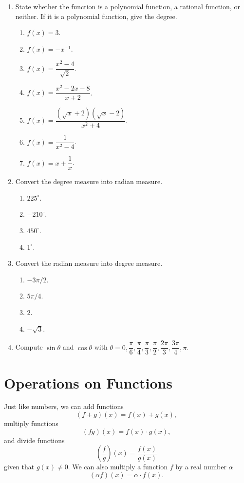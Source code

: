 \documentclass[11pt]{book}
\theoremstyle{break}
\theoremstyle{no_label}
\numberwithin{equation}{section}
\begin{document}
\begin{enumerate}[label=\arabic*.]
    \item State whether the function is a polynomial function, a rational function, or neither. If it is a polynomial function, give the degree.
    \begin{enumerate}
        \item $f(x)=3$.
        \item $f(x)=-x^{-1}$.
        \item $f(x)=\dfrac{x^2-4}{\sqrt{2}}$.
        \item $f(x)=\dfrac{x^2-2x-8}{x+2}$.
        \item $f(x)=\dfrac{(\sqrt{x}+2)(\sqrt{x}-2)}{x^2+4}$.
        \item $f(x)=\dfrac{1}{x^2-4}$.
        \item $f(x)=x+\dfrac{1}{x}$.
    \end{enumerate}
    \item Convert the degree measure into radian measure.
    \begin{enumerate}
        \item $225^\circ$.
        \item $-210^\circ$.
        \item $450^\circ$.
        \item $1^\circ$.
    \end{enumerate}
    \item Convert the radian measure into degree measure.
    \begin{enumerate}
        \item $-3\pi/2$.
        \item $5\pi/4$.
        \item $2$.
        \item $-\sqrt{3}$.
    \end{enumerate}
    \item Compute $\sin\theta$ and $\cos\theta$ with $\theta=0, \dfrac{\pi}{6}, \dfrac{\pi}{4}, \dfrac{\pi}{3}, \dfrac{\pi}{2}, \dfrac{2\pi}{3}, \dfrac{3\pi}{4}, \pi.$
    
\end{enumerate}


\section{Operations on Functions}

\setlength{\delimitershortfall}{0pt}

Just like numbers, we can add functions $$(f+g)(x)=f(x)+g(x),$$ multiply functions $$(fg)(x)=f(x)\cdot g(x),$$ and divide functions $$\left(\dfrac{f}{g}\right)(x)=\dfrac{f(x)}{g(x)}$$ given that $g(x)\ne 0$. We can also multiply a function $f$ by a real number $\alpha$ $$(\alpha f)(x)=\alpha\cdot f(x).$$
\end{document}
